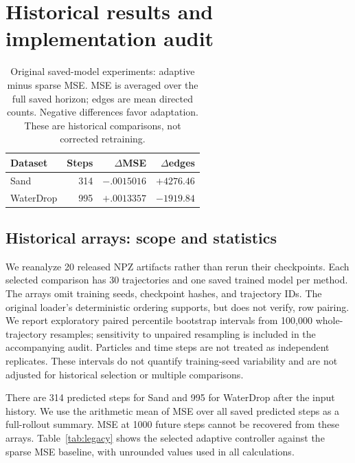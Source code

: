 \clearpage
\appendix
\thispagestyle{empty}
\onecolumn
{}
\section{Historical results and implementation audit}
\label{sec:historical-audit}

\begin{table}[t]
\centering\small
\caption{Original saved-model experiments: adaptive minus sparse MSE. MSE is averaged over the full saved horizon; edges are mean directed counts. Negative differences favor adaptation. These are historical comparisons, not corrected retraining.}
\label{tab:historical-main}
\begin{tabular}{lrrr}
\toprule
Dataset & Steps & $\Delta$MSE & $\Delta$edges\\
\midrule
Sand & 314 & $-.0015016$ & $+4276.46$\\
WaterDrop & 995 & $+.0013357$ & $-1919.84$\\
\bottomrule
\end{tabular}
\end{table}
\subsection{Historical arrays: scope and statistics}
We reanalyze 20 released NPZ artifacts rather than rerun their checkpoints. Each selected comparison has 30 trajectories and one saved trained model per method. The arrays omit training seeds, checkpoint hashes, and trajectory IDs. The original loader's deterministic ordering supports, but does not verify, row pairing. We report exploratory paired percentile bootstrap intervals from 100,000 whole-trajectory resamples; sensitivity to unpaired resampling is included in the accompanying audit. Particles and time steps are not treated as independent replicates. These intervals do not quantify training-seed variability and are not adjusted for historical selection or multiple comparisons.

There are 314 predicted steps for Sand and 995 for WaterDrop after the input history. We use the arithmetic mean of MSE over all saved predicted steps as a full-rollout summary. MSE at 1000 future steps cannot be recovered from these arrays. Table~\ref{tab:legacy} shows the selected adaptive controller against the sparse MSE baseline, with unrounded values used in all calculations.

